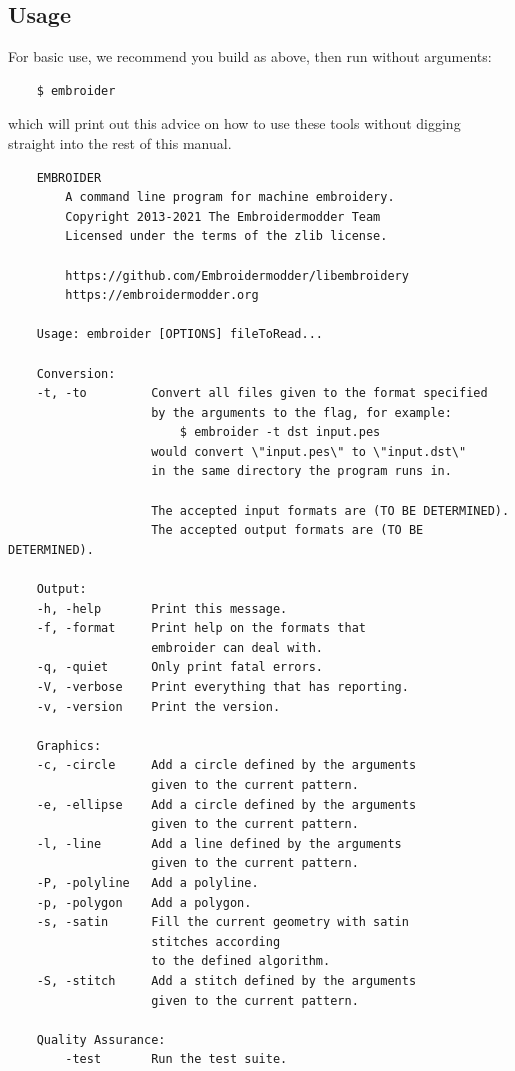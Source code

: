\documentclass[a4paper, 11pt]{report}
\begin{document}
\subsection{Usage}

For basic use, we recommend you build as above, then run without arguments:

\begin{verbatim}
    $ embroider
\end{verbatim}

which will print out this advice on how to use these tools without digging
straight into the rest of this manual.

\begin{verbatim}
    EMBROIDER
        A command line program for machine embroidery.
        Copyright 2013-2021 The Embroidermodder Team
        Licensed under the terms of the zlib license.

        https://github.com/Embroidermodder/libembroidery
        https://embroidermodder.org

    Usage: embroider [OPTIONS] fileToRead...

    Conversion:
    -t, -to         Convert all files given to the format specified
                    by the arguments to the flag, for example:
                        $ embroider -t dst input.pes
                    would convert \"input.pes\" to \"input.dst\"
                    in the same directory the program runs in.

                    The accepted input formats are (TO BE DETERMINED).
                    The accepted output formats are (TO BE DETERMINED).

    Output:
    -h, -help       Print this message.
    -f, -format     Print help on the formats that
                    embroider can deal with.
    -q, -quiet      Only print fatal errors.
    -V, -verbose    Print everything that has reporting.
    -v, -version    Print the version.

    Graphics:
    -c, -circle     Add a circle defined by the arguments
                    given to the current pattern.
    -e, -ellipse    Add a circle defined by the arguments
                    given to the current pattern.
    -l, -line       Add a line defined by the arguments
                    given to the current pattern.
    -P, -polyline   Add a polyline.
    -p, -polygon    Add a polygon.
    -s, -satin      Fill the current geometry with satin
                    stitches according
                    to the defined algorithm.
    -S, -stitch     Add a stitch defined by the arguments
                    given to the current pattern.

    Quality Assurance:
        -test       Run the test suite.
\end{verbatim}
\end{document}
